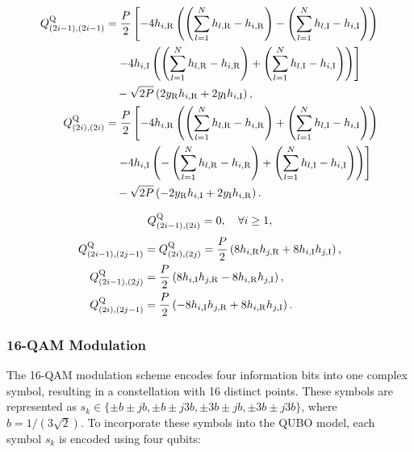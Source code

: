 \begin{figure}[H]
	\begin{align}
		Q_{(2i-1),(2i-1)}^{\rm Q} &= \frac{P}{2} \left[ -4 h_{i,{\rm R}} \left(
		\left( \sum_{l=1}^{N} h_{l,{\rm R}} - h_{i,{\rm R}} \right) - \left( \sum_{l=1}^{N} h_{l,{\rm I}} - h_{i,{\rm I}} \right)
		\right) \right. \nonumber \\
		&\quad \left. - 4 h_{i,{\rm I}} 
		\left(
		\left( \sum_{l=1}^{N} h_{l,{\rm R}} - h_{i,{\rm R}} \right) + 
		\left( \sum_{l=1}^{N} h_{l,{\rm I}} - h_{i,{\rm I}} \right)
		\right)
		\right] \nonumber \\
		&\quad - \sqrt{2 P} \left( 2 y_{\rm R} h_{i,{\rm R}} 
		+ 2 y_{\rm I} h_{i,{\rm I}} \right), \label{eq:Q1} \\
		Q_{(2i),(2i)}^{\rm Q} &= \frac{P}{2} \left[ -4 h_{i,{\rm R}} \left(
		\left( \sum_{l=1}^{N} h_{l,{\rm R}} - h_{i,{\rm R}} \right) + \left( \sum_{l=1}^{N} h_{l,{\rm I}} - h_{i,{\rm I}} \right)
		\right) \right. \nonumber \\
		&\quad \left. - 4 h_{i,{\rm I}} 
		\left(
		-\left( \sum_{l=1}^{N} h_{l,{\rm R}} - h_{i,{\rm R}} \right) + 
		\left( \sum_{l=1}^{N} h_{l,{\rm I}} - h_{i,{\rm I}} \right)
		\right)
		\right] \nonumber \\
		&\quad - \sqrt{2P} \left( -2 y_{\rm R} h_{i,{\rm I}} 
		+ 2 y_{\rm I} h_{i,{\rm R}} \right). \label{eq:Q2}
	\end{align}
\end{figure}
\vspace{-1cm}
\begin{equation}
    Q_{(2i-1),(2i)}^{\rm Q} = 0, \quad \forall i \ge 1, 
\end{equation}
\vspace{-1cm}
\begin{align}
    Q_{(2i-1),(2j-1)}^{\rm Q} &= Q_{(2i),(2j)}^{\rm Q} = \frac{P}{2} \left( 8 h_{i,{\rm R}} h_{j,{\rm R}} + 8 h_{i,{\rm I}} h_{j,{\rm I}} \right), \\
    Q_{(2i-1),(2j)}^{\rm Q} &= \frac{P}{2} \left( 8 h_{i,{\rm I}} h_{j,{\rm R}} 
    - 8 h_{i,{\rm R}} h_{j,{\rm I}} \right), \\
    Q_{(2i),(2j-1)}^{\rm Q} &= \frac{P}{2} \left( -8 h_{i,{\rm I}} h_{j,{\rm R}} 
    + 8 h_{i,{\rm R}} h_{j,{\rm I}} \right).
\end{align}

\subsubsection{16-QAM Modulation}
The 16-QAM modulation scheme encodes four information bits into one complex symbol, resulting in a constellation with 16 distinct points. These symbols are represented as $ s_{k} \in \{\pm b\pm jb, \pm b\pm j3b, \pm 3b\pm jb, \pm 3b \pm j3b\} $, where $b = 1/(3\sqrt{2})$. To incorporate these symbols into the QUBO model, each symbol $s_k$ is encoded using four qubits:

